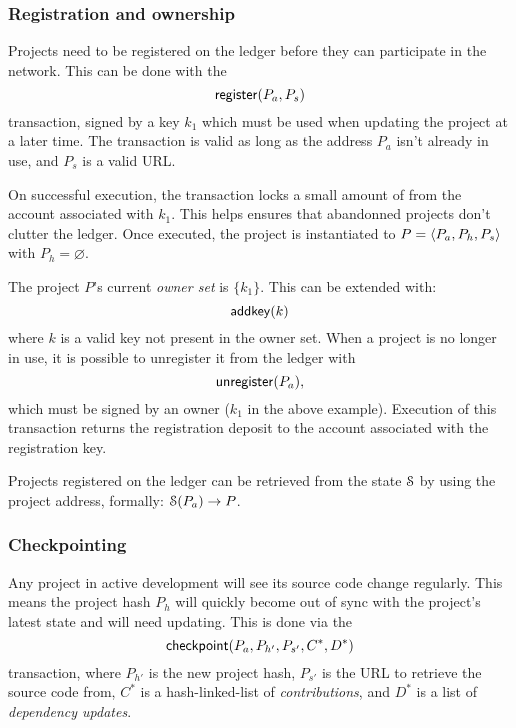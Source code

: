\subsubsection{Registration and ownership} Projects need to be
registered on the ledger before they can participate in the
network. This can be done with the
\[
    \mathsf{register}\small{\lparen P_a, P_s\rparen}
\]
transaction, signed by a key $k_1$ which must be used when updating the project
at a later time. The transaction is valid as long as the address $P_a$ isn't
already in use, and $P_s$ is a valid URL.

On successful execution, the transaction locks a small amount of \oscoin{} from
the account associated with $k_1$. This helps ensures that abandonned projects
don't clutter the ledger.  Once executed, the project is instantiated to $P =
\langle P_a, P_h, P_s\rangle$ with $P_h = \varnothing$.

The project $P$'s current \emph{owner set} is $\{k_1\}$. This can be extended
with:
\[
    \mathsf{addkey}\small{\lparen k\rparen}
\]
where $k$ is a valid key not present in the owner set.
When a project is no longer in use, it is possible to unregister it from the
ledger with
\[
    \mathsf{unregister}\small{\lparen P_a\rparen},
\]
which must be signed by an owner ($k_1$ in the above example).
Execution of this transaction returns the registration deposit to the account
associated with the registration key.

Projects registered on the ledger can be retrieved from the state $\mathcal{S}$ by
using the project address, formally: $\mathcal{S}(P_a) \to P$.

\subsubsection{Checkpointing} Any project in active development will see its
source code change regularly. This means the project hash $P_h$ will quickly
become out of sync with the project's latest state and will need updating. This
is done via the
\[
    \mathsf{checkpoint}\small{\lparen P_a, P_{h'}, P_{s'}, C^*, D^*\rparen}
\]
transaction, where $P_{h'}$ is the new project hash, $P_{s'}$ is the URL to
retrieve the source code from, $C^*$ is a hash-linked-list of
\emph{contributions}, and $D^*$ is a list of \emph{dependency updates}.

